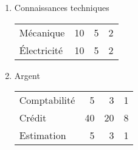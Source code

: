 \documentclass[11pt]{article}
\begin{document}
\begin{twocols}
\begin{enumerate}
\item Connaissances techniques
\label{sec:orgdcf4813}

\begin{center}
\begin{tabular}{lrrr}
Mécanique & 10 & 5 & 2\\
Électricité & 10 & 5 & 2\\
\end{tabular}
\end{center}

\item Argent
\label{sec:orgd56e2de}

\begin{center}
\begin{tabular}{lrrr}
Comptabilité & 5 & 3 & 1\\
Crédit & 40 & 20 & 8\\
Estimation & 5 & 3 & 1\\
\end{tabular}
\end{center}
\end{enumerate}


\end{twocols}
\pagebreak
\end{document}
